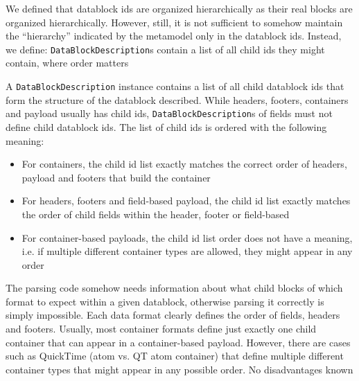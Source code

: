 We defined that datablock ids are organized hierarchically as their real blocks are organized hierarchically. However, still, it is not sufficient to somehow maintain the ``hierarchy'' indicated by the metamodel only in the datablock ids. Instead, we define:
{%
\texttt{DataBlockDescription}s contain a list of all child ids they might contain, where order matters
}
{%
A \texttt{DataBlockDescription} instance contains a list of all child datablock ids that form the structure of the datablock described. While headers, footers, containers and payload usually has child ids, \texttt{DataBlockDescription}s of fields must not define child datablock ids. The list of child ids is ordered with the following meaning:
\begin{itemize}
\item For containers, the child id list exactly matches the correct order of headers, payload and footers that build the container
\item For headers, footers and field-based payload, the child id list exactly matches the order of child fields within the header, footer or field-based
\item For container-based payloads, the child id list order does not have a meaning, i.e. if multiple different container types are allowed, they might appear in any order 
\end{itemize}
}
{%
The parsing code somehow needs information about what child blocks of which format to expect within a given datablock, otherwise parsing it correctly is simply impossible. Each data format clearly defines the order of fields, headers and footers. Usually, most container formats define just exactly one child container that can appear in a container-based payload. However, there are cases such as QuickTime (atom vs. QT atom container) that define multiple different container types that might appear in any possible order. 
}
{%
No disadvantages known
}

